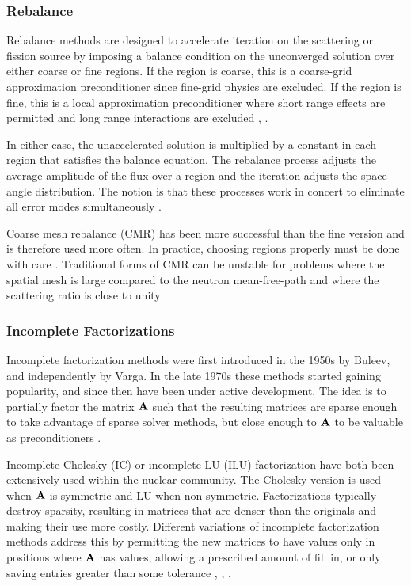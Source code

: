 \subsubsection{Rebalance}
Rebalance methods are designed to accelerate iteration on the scattering or fission source by imposing a balance condition on the unconverged solution over either coarse or fine regions. If the region is coarse, this is a coarse-grid approximation preconditioner since fine-grid physics are excluded. If the region is fine, this is a local approximation preconditioner where short range effects are permitted and long range interactions are excluded \cite{Trefethen1997}, \cite{Adams2002}.

In either case, the unaccelerated solution is multiplied by a constant in each region that satisfies the balance equation. The rebalance process adjusts the average amplitude of the flux over a region and the iteration adjusts the space-angle distribution. The notion is that these processes work in concert to eliminate all error modes simultaneously \cite{Adams2002}. 

Coarse mesh rebalance (CMR) has been more successful than the fine version and is therefore used more often. In practice, choosing regions properly must be done with care \cite{Lewis1993}. Traditional forms of CMR can be unstable for problems where the spatial mesh is large compared to the neutron mean-free-path and where the scattering ratio is close to unity \cite{Alcouffe1977}. 

\subsubsection{Incomplete Factorizations}
Incomplete factorization methods were first introduced in the 1950s by Buleev, and independently by Varga. In the late 1970s these methods started gaining popularity, and since then have been under active development. The idea is to partially factor the matrix $\mathbf{A}$ such that the resulting matrices are sparse enough to take advantage of sparse solver methods, but close enough to $\mathbf{A}$ to be valuable as preconditioners \cite{Benzi2002}.

Incomplete Cholesky (IC) or incomplete LU (ILU) factorization have both been extensively used within the nuclear community. The Cholesky version is used when $\mathbf{A}$ is symmetric and LU when non-symmetric. Factorizations typically destroy sparsity, resulting in matrices that are denser than the originals and making their use more costly. Different variations of incomplete factorization methods address this by permitting the new matrices to have values only in positions where $\mathbf{A}$ has values, allowing a prescribed amount of fill in, or only saving entries greater than some tolerance \cite{Trefethen1997}, \cite{Patton2002}, \cite{Oliveira1998}.

